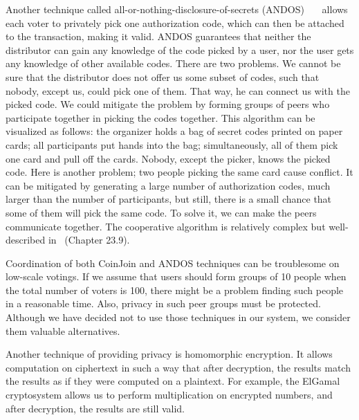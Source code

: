 \documentclass[applsci,article,submit,moreauthors,pdftex]{Definitions/mdpi}
\begin{document}
Another technique called all-or-nothing-disclosure-of-secrets (ANDOS)~\cite{andos}~\cite{salomaa1990secret}~\cite{applied_cryptography} allows each voter to privately pick one authorization code, which can then be attached to the transaction, making it valid. ANDOS guarantees that neither the distributor can gain any knowledge of the code picked by a user, nor the user gets any knowledge of other available codes. There are two problems. We cannot be sure that the distributor does not offer us some subset of codes, such that nobody, except us, could pick one of them. That way, he can connect us with the picked code. We could mitigate the problem by forming groups of peers who participate together in picking the codes together. This algorithm can be visualized as follows: the organizer holds a bag of secret codes printed on paper cards; all participants put hands into the bag; simultaneously, all of them pick one card and pull off the cards. Nobody, except the picker, knows the picked code. Here is another problem; two people picking the same card cause conflict. It can be mitigated by generating a large number of authorization codes, much larger than the number of participants, but still, there is a small chance that some of them will pick the same code. To solve it, we can make the peers communicate together. The cooperative algorithm is relatively complex but well-described in~\cite{applied_cryptography} (Chapter 23.9).


Coordination of both CoinJoin and ANDOS techniques can be troublesome on low-scale votings. If we assume that users should form groups of 10 people when the total number of voters is 100, there might be a problem finding such people in a reasonable time. Also, privacy in such peer groups must be protected. Although we have decided not to use those techniques in our system, we consider them valuable alternatives.

Another technique of providing privacy is homomorphic encryption. It allows computation on ciphertext in such a way that after decryption, the results match the results as if they were computed on a plaintext. For example, the ElGamal cryptosystem allows us to perform multiplication on encrypted numbers, and after decryption, the results are still valid. 
\end{document}
